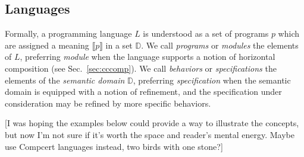 \documentclass[acmsmall,10pt,review,anonymous]{acmart}
\begin{document}
\subsection{Languages} %

Formally,
a programming language $L$ is understood as
a set of programs $p$
which are assigned a meaning $\llbracket p \rrbracket$
in a set $\mathbb{D}$.
We call \emph{programs} or \emph{modules} the elements of $L$,
preferring \emph{module} when
the language supports
a notion of horizontal composition (see Sec.~\ref{sec:cccomp}).
We call \emph{behaviors} or \emph{specifications}
the elements of the \emph{semantic domain} $\mathbb{D}$,
preferring \emph{specification} when
the semantic domain is equipped with
a notion of refinement,
and the specification under consideration
may be refined by more specific behaviors.

[I was hoping the examples below could provide a way to illustrate
the concepts,
but now I'm not sure if it's worth the space
and reader's mental energy.
Maybe use Compcert languages instead,
two birds with one stone?]
\end{document}
